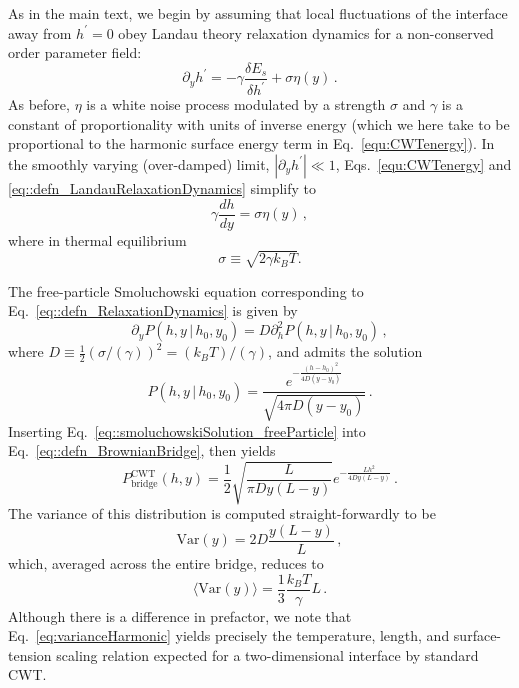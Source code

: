 \documentclass[twoside,twocolumn,9pt]{article}
\begin{document}
As in the main text, we begin by assuming that local fluctuations of the interface away from $h^{\prime}=0$ obey Landau theory relaxation dynamics for a non-conserved order parameter field:
\begin{equation}
    \partial_{y}h^{\prime} = -\gamma\frac{\delta{E_s}}{\delta{h}^{\prime}}+ \sigma\eta(y)\, .
\end{equation}
As before, $\eta$ is a white noise process modulated by a strength $\sigma$ and $\gamma$ is a constant of proportionality with units of inverse energy (which we here take to be proportional to the harmonic surface energy term in Eq.~\ref{equ:CWTenergy}). In the smoothly varying (over-damped) limit, $|\partial_{y}h^{\prime}|\ll 1$, 
Eqs.~\ref{equ:CWTenergy} and \ref{eq::defn_LandauRelaxationDynamics}
simplify to
\begin{equation}
    \label{eq::defn_RelaxationDynamics}
    \gamma\frac{dh}{dy} = \sigma\eta(y)\, ,
\end{equation}
where in thermal equilibrium
\begin{equation}
  \sigma \equiv \sqrt{2\gamma{k}_{B}T}.
\end{equation}

The free-particle Smoluchowski equation corresponding to Eq.~\ref{eq::defn_RelaxationDynamics} is given by
\begin{equation}
    \partial_{y}P(h,y\,|\,h_{0},y_{0}) = D\partial_{h}^{2}P(h,y\,|\,h_{0},y_{0})\,,
\end{equation}
where $D \equiv \frac{1}{2}\left(\sigma/(\gamma)\right)^{2}=(k_{B}T)/(\gamma)$, and admits the solution
\begin{equation}
    \label{eq::smoluchowskiSolution_freeParticle}
    P(h,y\,|\,h_{0},y_{0}) = \frac{e^{-\frac{(h-h_{0})^{2}}{4D(y-y_{0})}}}{\sqrt{4\pi{D}(y-y_{0})}}\,.
\end{equation}
Inserting Eq.~\ref{eq::smoluchowskiSolution_freeParticle} into Eq.~\ref{eq::defn_BrownianBridge}, then yields
\begin{equation}
    \label{eq::BrownianBridge_CWT}
    {P}_{\text{bridge}}^{\text{CWT}}(h,y) = \frac{1}{2}\sqrt{\frac{L}{\pi{D}{y}(L-y)}}e^{-\frac{Lh^{2}}{4Dy(L-y)}}\,.
\end{equation}
The variance of this distribution is computed straight-forwardly to be
\begin{equation}
    \label{eq::BrownianBridgeVariance_FreeParticle}
    \textrm{Var}(y) = 2D\frac{y(L-y)}{L}\,,
\end{equation}
which, averaged across the entire bridge, reduces to
\begin{equation}
    \label{eq:varianceHarmonic}
    \langle\textrm{Var}(y)\rangle = \frac{1}{3}\frac{k_{B}T}{\gamma}L\,.
\end{equation}
Although there is a difference in prefactor, we note that Eq.~\ref{eq:varianceHarmonic} yields precisely the temperature, length, and surface-tension scaling relation expected for a two-dimensional interface by standard CWT.
\end{document}

